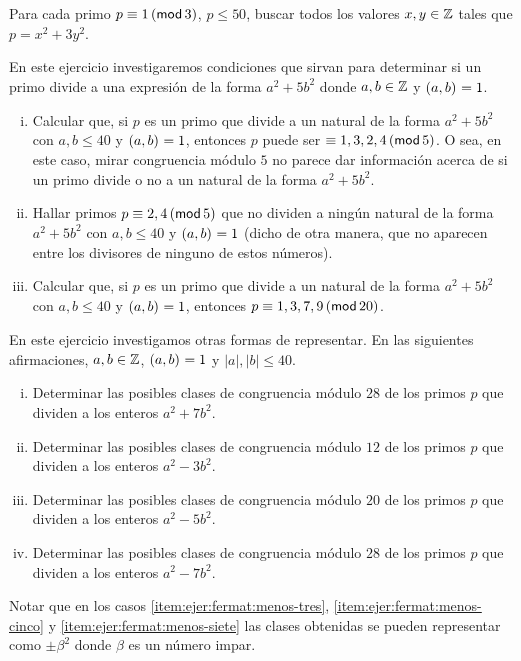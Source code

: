 \begin{ejerFermat}
	Para cada primo $p\equiv 1\tmodulo[3]$, $p\leq 50$, buscar todos los
	valores $x,y\in\Enteros$ tales que $p=x^2+3y^2$.
\end{ejerFermat}

\begin{ejerFermat}\label{ejer:fermat:cinco}
	En este ejercicio investigaremos condiciones que sirvan para
	determinar si un primo divide a una expresi\'on de la forma
	$a^2+5b^2$ donde $a,b\in\Enteros$ y $\mcd{a,b}=1$.
	\begin{enumerate}[(i)]
		\item\label{item:ejer:fermat:cinco:i}
			Calcular que, si $p$ es un primo que divide a un
			natural de la forma $a^2+5b^2$ con $a,b\leq 40$
			y $\mcd{a,b}=1$, entonces $p$ puede ser
			$\equiv 1,3,2,4\tmodulo[5]$.
			O sea, en este caso, mirar congruencia m\'odulo $5$
			no parece dar informaci\'on acerca de si un primo
			divide o no a un natural de la forma $a^2+5b^2$.
		\item\label{item:ejer:fermat:cinco:ii}
			Hallar primos $p\equiv 2,4\tmodulo[5]$ que no
			dividen a ning\'un natural de la forma $a^2+5b^2$
			con $a,b\leq 40$ y $\mcd{a,b}=1$
			(dicho de otra manera, que no aparecen entre los
			divisores de ninguno de estos n\'umeros).
		\item\label{item:ejer:fermat:cinco:iii}
			Calcular que, si $p$ es un primo que divide a un
			natural de la forma $a^2+5b^2$ con $a,b\leq 40$
			y $\mcd{a,b}=1$, entonces
			$p\equiv 1,3,7,9\tmodulo[20]$.
	\end{enumerate}
\end{ejerFermat}

\begin{ejerFermat}\label{ejer:fermat:otras}
	En este ejercicio investigamos otras formas de representar.
	En las siguientes afirmaciones, $a,b\in\Enteros$, $\mcd{a,b}=1$
	y $|a|,|b|\leq 40$.
	\begin{enumerate}[(i)]
		\item\label{item:ejer:fermat:siete}
			Determinar las posibles clases de congruencia
			m\'odulo $28$ de los primos $p$ que dividen a
			los enteros $a^2+7b^2$.
		\item\label{item:ejer:fermat:menos-tres}
			Determinar las posibles clases de congruencia
			m\'odulo $12$ de los primos $p$ que dividen a
			los enteros $a^2-3b^2$.
		\item\label{item:ejer:fermat:menos-cinco}
			Determinar las posibles clases de congruencia
			m\'odulo $20$ de los primos $p$ que dividen a
			los enteros $a^2-5b^2$.
		\item\label{item:ejer:fermat:menos-siete}
			Determinar las posibles clases de congruencia
			m\'odulo $28$ de los primos $p$ que dividen a
			los enteros $a^2-7b^2$.
	\end{enumerate}
	Notar que en los casos \eqref{item:ejer:fermat:menos-tres},
	\eqref{item:ejer:fermat:menos-cinco} y
	\eqref{item:ejer:fermat:menos-siete} las clases obtenidas se pueden
	representar como $\pm\beta^2$ donde $\beta$ es un n\'umero impar.
\end{ejerFermat}

